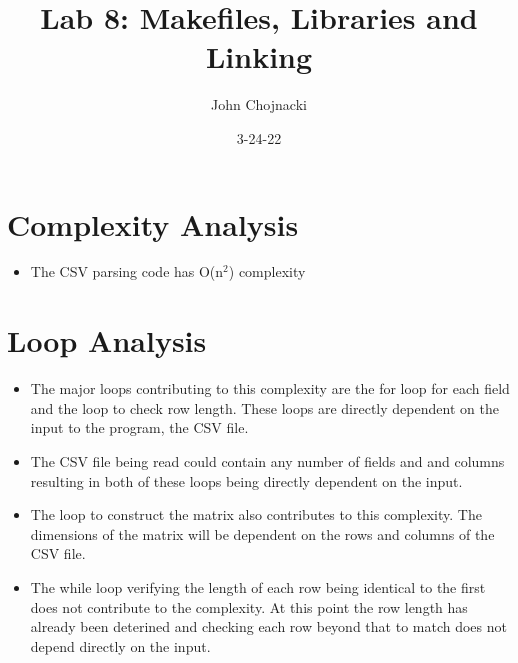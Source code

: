 \documentclass{article}
\title{Lab 8: Makefiles, Libraries and Linking}
\date{3-24-22}
\author{John Chojnacki}
\begin{document}
\maketitle
\newpage
\section{Complexity Analysis}
\begin{itemize}
\item{The CSV parsing code has O(n$^2$) complexity}
\end{itemize}
\section{Loop Analysis}
\begin{itemize}
\item{The major loops contributing to this complexity are the for loop for each field and the loop to check row length. These loops are directly dependent on the input to the program, the CSV file.}
\item{The CSV file being read could contain any number of fields and and columns resulting in both of these loops being directly dependent on the input.}
\item{The loop to construct the matrix also contributes to this complexity. The dimensions of the matrix will be dependent on the rows and columns of the CSV file.}
\item{The while loop verifying the length of each row being identical to the first does not contribute to the complexity. At this point the row length has already been deterined and checking each row beyond that to match does not depend directly on the input.}
\end{itemize}
\end{document}
